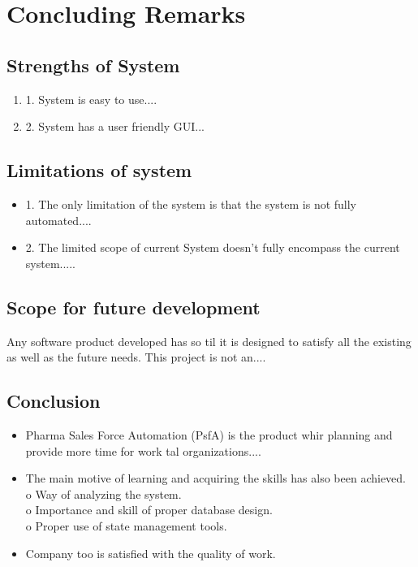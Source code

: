 \chapter{Concluding Remarks}


\section{Strengths of System}
\begin{enumerate}
\item 1.	System is easy to use....
\item 2.	System has a user friendly GUI...


\end{enumerate}

\section{Limitations of system}

\begin{itemize}
\item 1.	The only limitation of the system is that the system is not fully automated....
\item 2.	The limited scope of current System doesn’t fully encompass the current system.....


\end{itemize}

\section{Scope for future development} 

Any software product developed has so til it is designed to satisfy all the existing as well as the future needs. This project is not an....



\section{Conclusion}

\begin{itemize}
\item	Pharma Sales Force Automation (PsfA) is the product whir planning and provide more time for work tal organizations....
\item	The main motive of learning and acquiring the skills has also been achieved. \\
o	Way of analyzing the system.\\

o	Importance and skill of proper database design.\\
o	Proper use of state management tools.\\


\item	Company too is satisfied with the quality of work.

\end{itemize}